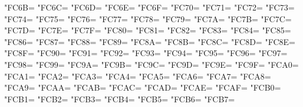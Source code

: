 \XeTeXcharclass"FC6B=\KclassArabU
\XeTeXcharclass"FC6C=\KclassArabU
\XeTeXcharclass"FC6D=\KclassArabU
\XeTeXcharclass"FC6E=\KclassArabU
\XeTeXcharclass"FC6F=\KclassArabU
\XeTeXcharclass"FC70=\KclassArabU
\XeTeXcharclass"FC71=\KclassArabU
\XeTeXcharclass"FC72=\KclassArabU
\XeTeXcharclass"FC73=\KclassArabU
\XeTeXcharclass"FC74=\KclassArabU
\XeTeXcharclass"FC75=\KclassArabU
\XeTeXcharclass"FC76=\KclassArabU
\XeTeXcharclass"FC77=\KclassArabU
\XeTeXcharclass"FC78=\KclassArabU
\XeTeXcharclass"FC79=\KclassArabU
\XeTeXcharclass"FC7A=\KclassArabU
\XeTeXcharclass"FC7B=\KclassArabU
\XeTeXcharclass"FC7C=\KclassArabU
\XeTeXcharclass"FC7D=\KclassArabU
\XeTeXcharclass"FC7E=\KclassArabU
\XeTeXcharclass"FC7F=\KclassArabU
\XeTeXcharclass"FC80=\KclassArabU
\XeTeXcharclass"FC81=\KclassArabU
\XeTeXcharclass"FC82=\KclassArabU
\XeTeXcharclass"FC83=\KclassArabU
\XeTeXcharclass"FC84=\KclassArabU
\XeTeXcharclass"FC85=\KclassArabU
\XeTeXcharclass"FC86=\KclassArabU
\XeTeXcharclass"FC87=\KclassArabU
\XeTeXcharclass"FC88=\KclassArabU
\XeTeXcharclass"FC89=\KclassArabU
\XeTeXcharclass"FC8A=\KclassArabU
\XeTeXcharclass"FC8B=\KclassArabU
\XeTeXcharclass"FC8C=\KclassArabU
\XeTeXcharclass"FC8D=\KclassArabU
\XeTeXcharclass"FC8E=\KclassArabU
\XeTeXcharclass"FC8F=\KclassArabU
\XeTeXcharclass"FC90=\KclassArabU
\XeTeXcharclass"FC91=\KclassArabU
\XeTeXcharclass"FC92=\KclassArabU
\XeTeXcharclass"FC93=\KclassArabU
\XeTeXcharclass"FC94=\KclassArabU
\XeTeXcharclass"FC95=\KclassArabU
\XeTeXcharclass"FC96=\KclassArabU
\XeTeXcharclass"FC97=\KclassArabU
\XeTeXcharclass"FC98=\KclassArabU
\XeTeXcharclass"FC99=\KclassArabU
\XeTeXcharclass"FC9A=\KclassArabU
\XeTeXcharclass"FC9B=\KclassArabU
\XeTeXcharclass"FC9C=\KclassArabU
\XeTeXcharclass"FC9D=\KclassArabU
\XeTeXcharclass"FC9E=\KclassArabU
\XeTeXcharclass"FC9F=\KclassArabU
\XeTeXcharclass"FCA0=\KclassArabU
\XeTeXcharclass"FCA1=\KclassArabU
\XeTeXcharclass"FCA2=\KclassArabU
\XeTeXcharclass"FCA3=\KclassArabU
\XeTeXcharclass"FCA4=\KclassArabU
\XeTeXcharclass"FCA5=\KclassArabU
\XeTeXcharclass"FCA6=\KclassArabU
\XeTeXcharclass"FCA7=\KclassArabU
\XeTeXcharclass"FCA8=\KclassArabU
\XeTeXcharclass"FCA9=\KclassArabU
\XeTeXcharclass"FCAA=\KclassArabU
\XeTeXcharclass"FCAB=\KclassArabU
\XeTeXcharclass"FCAC=\KclassArabU
\XeTeXcharclass"FCAD=\KclassArabU
\XeTeXcharclass"FCAE=\KclassArabU
\XeTeXcharclass"FCAF=\KclassArabU
\XeTeXcharclass"FCB0=\KclassArabU
\XeTeXcharclass"FCB1=\KclassArabU
\XeTeXcharclass"FCB2=\KclassArabU
\XeTeXcharclass"FCB3=\KclassArabU
\XeTeXcharclass"FCB4=\KclassArabU
\XeTeXcharclass"FCB5=\KclassArabU
\XeTeXcharclass"FCB6=\KclassArabU
\XeTeXcharclass"FCB7=\KclassArabU
